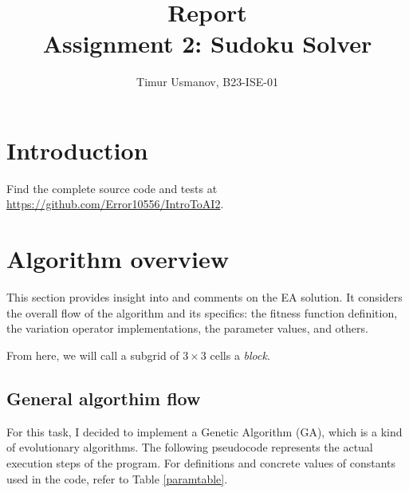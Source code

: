 \documentclass[10pt]{article}
\begin{document}
\title{Report\\Assignment 2: Sudoku Solver}
\author{Timur Usmanov, B23-ISE-01}
\maketitle

\section{Introduction}
Find the complete source code and tests at \url{https://github.com/Error10556/IntroToAI2}.

\section{Algorithm overview}

This section provides insight into and comments on the EA solution. It considers
the overall flow of the algorithm and its specifics: the fitness function definition,
the variation operator implementations, the parameter values, and others.

From here, we will call a subgrid of $3\times3$ cells a \textit{block}.

\subsection{General algorthim flow}\label{flowlisting}

For this task, I decided to implement a Genetic Algorithm (GA), which is a kind of evolutionary algorithms.
The following pseudocode represents the actual execution steps of the program. For definitions and
concrete values of constants used in the code, refer to Table \ref{paramtable}.
\end{document}
